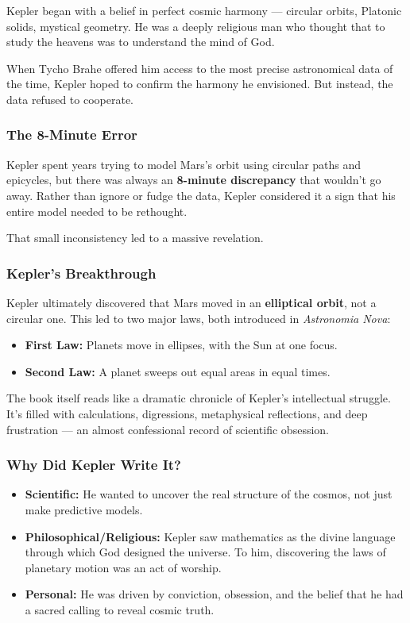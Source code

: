 Kepler began with a belief in perfect cosmic harmony — circular orbits, Platonic solids, mystical geometry. He was a deeply religious man who thought that to study the heavens was to understand the mind of God.

When Tycho Brahe offered him access to the most precise astronomical data of the time, Kepler hoped to confirm the harmony he envisioned. But instead, the data refused to cooperate.

\subsubsection{The 8-Minute Error}

Kepler spent years trying to model Mars’s orbit using circular paths and epicycles, but there was always an \textbf{8-minute discrepancy} that wouldn’t go away. Rather than ignore or fudge the data, Kepler considered it a sign that his entire model needed to be rethought.

That small inconsistency led to a massive revelation.

\subsubsection{Kepler’s Breakthrough}

Kepler ultimately discovered that Mars moved in an \textbf{elliptical orbit}, not a circular one. This led to two major laws, both introduced in \textit{Astronomia Nova}:

\begin{itemize}
  \item \textbf{First Law:} Planets move in ellipses, with the Sun at one focus.
  \item \textbf{Second Law:} A planet sweeps out equal areas in equal times.
\end{itemize}

The book itself reads like a dramatic chronicle of Kepler’s intellectual struggle. It’s filled with calculations, digressions, metaphysical reflections, and deep frustration — an almost confessional record of scientific obsession.

\subsubsection{Why Did Kepler Write It?}

\begin{itemize}
  \item \textbf{Scientific:} He wanted to uncover the real structure of the cosmos, not just make predictive models.
  \item \textbf{Philosophical/Religious:} Kepler saw mathematics as the divine language through which God designed the universe. To him, discovering the laws of planetary motion was an act of worship.
  \item \textbf{Personal:} He was driven by conviction, obsession, and the belief that he had a sacred calling to reveal cosmic truth.
\end{itemize}



